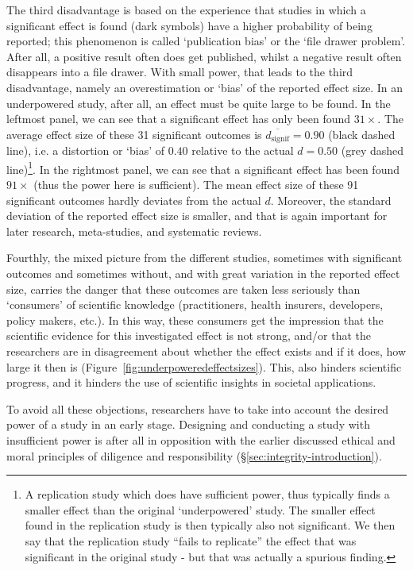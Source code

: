 \documentclass[
]{book}
\begin{document}
The third disadvantage is based on the experience that studies in which
a significant effect is found (dark symbols) have a higher probability
of being reported; this phenomenon is called
`publication bias' or the `file drawer problem'. After all, a positive result
often does get published, whilst a negative result often disappears
into a file drawer. With small power, that leads to the third disadvantage,
namely an overestimation or `bias' of the reported effect size.
In an underpowered study, after all, an effect
must be quite large to be found. In the leftmost panel, we can see that
a significant effect has only been found \(31\times\). The average effect size of these
31 significant outcomes is \(\overline{d_{\textrm{signif}}}=0.90\) (black dashed line), i.e.
a distortion or `bias' of \(0.40\) relative to the actual
\(d=0.50\) (grey dashed line)\footnote{A replication study which does have sufficient power, thus typically finds a smaller effect than the
  original `underpowered' study. The smaller effect found in the replication study is then typically also not
  significant. We then say that the replication study ``fails to replicate'' the effect that was significant in
  the original study - but that was actually a spurious finding.}. In the rightmost panel, we can see that
a significant effect has been found \(91\times\) (thus the power here is sufficient).
The mean effect size of these 91 significant outcomes hardly deviates
from the actual \(d\). Moreover, the standard deviation of the reported
effect size is smaller, and that is again important for later research, meta-studies,
and systematic reviews.

Fourthly, the mixed picture from the different studies, sometimes with significant
outcomes and sometimes without, and with great variation in the reported
effect size, carries the danger that these
outcomes are taken less seriously than `consumers' of
scientific knowledge (practitioners, health insurers, developers,
policy makers, etc.). In this way, these consumers get the impression
that the scientific evidence for this investigated effect is not strong,
and/or that the researchers are in disagreement about whether the effect exists
and if it does, how large it then is \citep{Kolf93} (Figure~\ref{fig:underpoweredeffectsizes}).
This, also hinders scientific progress, and it hinders the use
of scientific insights in societal applications.

To avoid all these objections, researchers have to take into account
the desired power of a study in an early stage. Designing and conducting
a study with insufficient power is after all in opposition with the earlier discussed
ethical and moral principles of diligence and responsibility
(§\ref{sec:integrity-introduction}).
\end{document}
